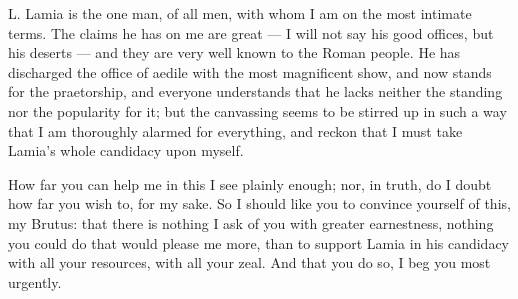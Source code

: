 

 L. Lamia is the one man, of all men, with whom I am on the most intimate terms. The claims he has on me are great --- I will not say his good offices, but his deserts --- and they are very well known to the Roman people. He has discharged the office of aedile with the most magnificent show, and now stands for the praetorship, and everyone understands that he lacks neither the standing nor the popularity for it; but the canvassing seems to be stirred up in such a way that I am thoroughly alarmed for everything, and reckon that I must take Lamia's whole candidacy upon myself.

 How far you can help me in this I see plainly enough; nor, in truth, do I doubt how far you wish to, for my sake. So I should like you to convince yourself of this, my Brutus: that there is nothing I ask of you with greater earnestness, nothing you could do that would please me more, than to support Lamia in his candidacy with all your resources, with all your zeal. And that you do so, I beg you most urgently.
